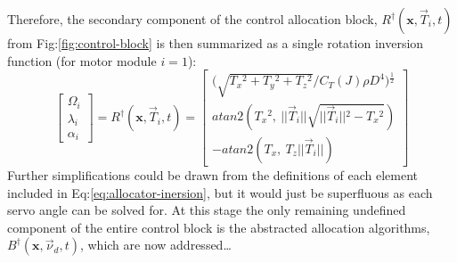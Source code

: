 Therefore, the secondary component of the control allocation block, $R^\dagger(\mathbf{x},\vec{T}_i,t)$ from Fig:\ref{fig:control-block} is then summarized as a single rotation inversion function (for motor module $i=1$):
\begin{equation}\label{eq:allocator-inersion}
\begin{bmatrix}
\Omega_i\\
\lambda_i\\
\alpha_i
\end{bmatrix}
=
R^\dagger(\mathbf{x},\vec{T}_i,t)=
\begin{bmatrix}
\Big(\sqrt{T_x\text{}^2+T_y\text{}^2+T_z\text{}^2}/C_T(J)\rho D^4\Big)\text{}^{\frac{1}{2}}\\
atan2(T_x\text{}^2,~||\vec{T}_i||\sqrt{||\vec{T}_i||\text{}^2-T_x\text{}^2})\\
-atan2(T_x,~T_z||\vec{T}_i||)
\end{bmatrix}
\end{equation}
Further simplifications could be drawn from the definitions of each element included in Eq:\ref{eq:allocator-inersion}, but it would just be superfluous as each servo angle can be solved for. At this stage the only remaining undefined component of the entire control block is the abstracted allocation algorithms, $B^\dagger(\mathbf{x},\vec{\nu}_d,t)$, which are now addressed\ldots
